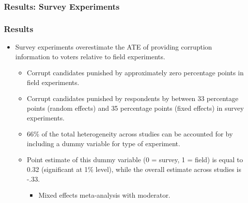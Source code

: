 \documentclass[usenames,dvipsnames]{beamer}
\begin{document}
\begin{frame}
\frametitle{Results: Survey Experiments}


\end{frame}


\begin{frame}
\frametitle{Results}
\begin{itemize}
\item Survey experiments overestimate the ATE of providing corruption information to voters relative to field experiments.
\pause
\begin{itemize}
\item Corrupt candidates punished by approximately \textcolor{Cerulean}{zero percentage points} in field experiments.
\pause
\item Corrupt candidates punished by respondents by between \textcolor{Cerulean}{33 percentage points} (random effects) and \textcolor{Cerulean}{35 percentage points} (fixed effects) in survey experiments.
\pause
\item 66\% of the total heterogeneity across studies can be accounted for by including a dummy variable for type of experiment.
\pause
\item Point estimate of this dummy variable (0 = survey, 1 = field) is equal to 0.32 (significant at 1\% level), while the overall estimate across studies is -.33. 
\begin{itemize}
\item Mixed effects meta-analysis with moderator. 
\end{itemize}
\end{itemize}
\end{itemize}
\end{frame}
\end{document}
